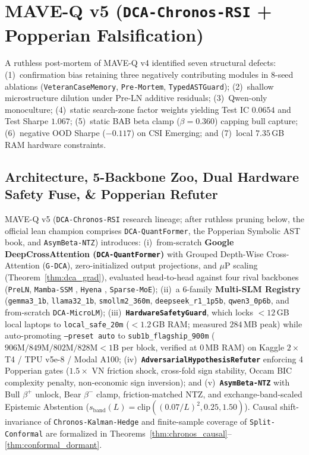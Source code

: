 \documentclass[11pt]{article}
\begin{document}


\section{MAVE-Q v5 (\texttt{DCA-Chronos-RSI} + Popperian Falsification)}
\label{sec:maveq_v5}
A ruthless post-mortem of MAVE-Q v4 identified seven structural defects: (1)~confirmation bias retaining three negatively contributing modules in 8-seed ablations (\texttt{VeteranCaseMemory}, \texttt{Pre-Mortem}, \texttt{TypedASTGuard}); (2)~shallow microstructure dilution under Pre-LN additive residuals; (3)~Qwen-only monoculture; (4)~static search-zone factor weights yielding Test IC $0.0654$ and Test Sharpe $1.067$; (5)~static BAB beta clamp ($\beta=0.360$) capping bull capture; (6)~negative OOD Sharpe ($-0.117$) on CSI Emerging; and (7)~local $7.35$\,GB RAM hardware constraints.

\subsection{Architecture, 5-Backbone Zoo, Dual Hardware Safety Fuse, \& Popperian Refuter}
MAVE-Q v5 (\texttt{DCA-Chronos-RSI} research lineage; after ruthless pruning below, the official lean champion comprises \texttt{DCA-QuantFormer}, the Popperian Symbolic AST book, and \texttt{AsymBeta-NTZ}) introduces: (i)~from-scratch \textbf{Google DeepCrossAttention (\texttt{DCA-QuantFormer})} \citep{heddes2025dca} with Grouped Depth-Wise Cross-Attention (\texttt{G-DCA}), zero-initialized output projections, and $\mu$P scaling \citep{yang2022mup} (Theorem~\ref{thm:dca_grad}), evaluated head-to-head against four rival backbones (\texttt{PreLN}, \texttt{Mamba-SSM} \citealt{gu2023mamba}, \texttt{Hyena} \citealt{poli2023hyena}, \texttt{Sparse-MoE}); (ii)~a 6-family \textbf{Multi-SLM Registry} (\texttt{gemma3\_1b}, \texttt{llama32\_1b}, \texttt{smollm2\_360m}, \texttt{deepseek\_r1\_1p5b}, \texttt{qwen3\_0p6b}, and from-scratch \texttt{DCA-MicroLM}); (iii)~\textbf{\texttt{HardwareSafetyGuard}}, which locks $<12$\,GB local laptops to \texttt{local\_safe\_20m} ($<1.2$\,GB RAM; measured $284$\,MB peak) while auto-promoting \texttt{--preset auto} to \texttt{sub1b\_flagship\_900m} ($906\text{M}/849\text{M}/802\text{M}/828\text{M} < 1\text{B}$ per block, verified at $0$\,MB RAM) on Kaggle $2\times$T4 / TPU v5e-8 / Modal A100; (iv)~\textbf{\texttt{AdversarialHypothesisRefuter}} enforcing 4 Popperian gates ($1.5\times$ VN friction shock, cross-fold sign stability, Occam BIC complexity penalty, non-economic sign inversion); and (v)~\textbf{\texttt{AsymBeta-NTZ}} with Bull $\beta^+$ unlock, Bear $\beta^-$ clamp, friction-matched NTZ, and exchange-band-scaled Epistemic Abstention ($s_{\text{band}}(L) = \text{clip}((0.07/L)^2, 0.25, 1.50)$). Causal shift-invariance of \texttt{Chronos-Kalman-Hedge} and finite-sample coverage of \texttt{Split-Conformal} are formalized in Theorems~\ref{thm:chronos_causal}--\ref{thm:conformal_dormant}.
\end{document}

